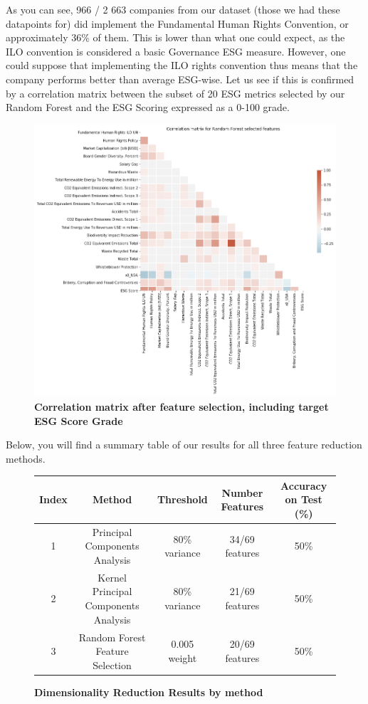 \documentclass[12pt]{report}
\begin{document}
As you can see, 966 / 2 663 companies from our dataset (those we had these datapoints for) did implement the Fundamental Human Rights Convention, or approximately 36\% of them. This is lower than what one could expect, as the ILO convention is considered a basic Governance ESG measure. However, one could suppose that implementing the ILO rights convention thus means that the company performs better than average ESG-wise. Let us see if this is confirmed by a correlation matrix between the subset of 20 ESG metrics selected by our Random Forest and the ESG Scoring expressed as a 0-100 grade.

\begin{figure}[h!]
\centering
\includegraphics[scale=0.5]{corrplot_random_forest.png}
\caption{\textbf{Correlation matrix after feature selection, including target ESG Score Grade}}
\label{fig:rf_corrplot}
\end{figure}

Below, you will find a summary table of our results for all three feature reduction methods. 
\begin{figure}[h!]
\begin{center}
\begin{tabular}{ |c|c|c|c|c| }
\hline
 Index & Method  & Threshold & Number Features & Accuracy on Test (\%) \\
 \hline\hline
 1 & Principal Components Analysis & 80\% variance & 34/69 features & 50\% \\  
 2 & Kernel Principal Components Analysis & 80\% variance & 21/69 features & 50\%\\
 3 & Random Forest Feature Selection & 0.005 weight & 20/69 features & 50\%\\
\hline
\end{tabular}
\end{center}
\caption{\textbf{Dimensionality Reduction Results by method}}
\label{fig:dimensionality_benchmark}
\end{figure}
\end{document}
